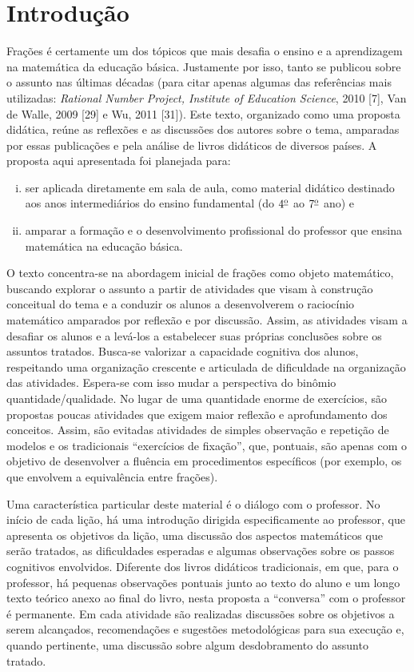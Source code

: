 \documentclass[a4,12pt,openany]{book}
\begin{document}
\chapter{Introdução}

Frações é certamente um dos tópicos que mais desafia o ensino e a aprendizagem na matemática da educação básica. Justamente por isso, tanto se publicou sobre o assunto nas últimas décadas (para citar apenas algumas das referências mais utilizadas:  {\it Rational Number Project, Institute of Education Science}, 2010 [7], Van de Walle, 2009 [29] e Wu, 2011 [31]). Este texto, organizado como uma proposta didática,  reúne as reflexões e as discussões dos autores sobre o tema, amparadas por essas publicações e pela análise de livros didáticos de diversos países. A proposta aqui apresentada foi planejada para:

\begin{enumerate}[(i)]
\item  ser aplicada diretamente em sala de aula, como material didático destinado aos anos intermediários do ensino fundamental (do $4^{\textrm{\underline{o}}}$ ao $7^{\textrm{\underline{o}}}$ ano) e 
\item amparar a formação e o desenvolvimento profissional do professor que ensina matemática na educação básica.
\end{enumerate}

O texto concentra-se na abordagem inicial de frações como objeto matemático, buscando explorar o assunto a partir de atividades que visam à construção conceitual do tema e a conduzir os alunos a desenvolverem o raciocínio matemático amparados por reflexão e por discussão. Assim, as atividades visam a desafiar os alunos e a levá-los a estabelecer suas próprias conclusões sobre os assuntos tratados. Busca-se valorizar a capacidade cognitiva dos alunos, respeitando uma organização crescente e articulada de diﬁculdade na organização das atividades. Espera-se com isso mudar a perspectiva do binômio quantidade/qualidade. No lugar de uma quantidade enorme de exercícios, são propostas poucas  atividades que exigem maior reflexão e aprofundamento dos conceitos. Assim, são evitadas atividades de simples observação e repetição de modelos e os tradicionais ``exercícios de fixação'', que, pontuais, são apenas com o objetivo de desenvolver a fluência em procedimentos específicos (por exemplo, os que envolvem a equivalência entre frações). 

Uma característica particular deste material é o diálogo com o professor. No início de cada lição, há uma introdução dirigida especificamente ao professor, que apresenta os objetivos da lição, uma discussão dos aspectos matemáticos que serão tratados, as dificuldades esperadas e algumas observações sobre os passos cognitivos envolvidos. Diferente dos livros didáticos tradicionais, em que, para o professor, há pequenas observações pontuais junto ao texto do aluno e um longo texto teórico anexo ao final do livro, nesta proposta a ``conversa'' com o professor é permanente. Em cada atividade são realizadas discussões sobre os objetivos a serem alcançados, recomendações e sugestões metodológicas para sua execução e, quando pertinente, uma discussão sobre algum desdobramento do assunto tratado.
\end{document}
